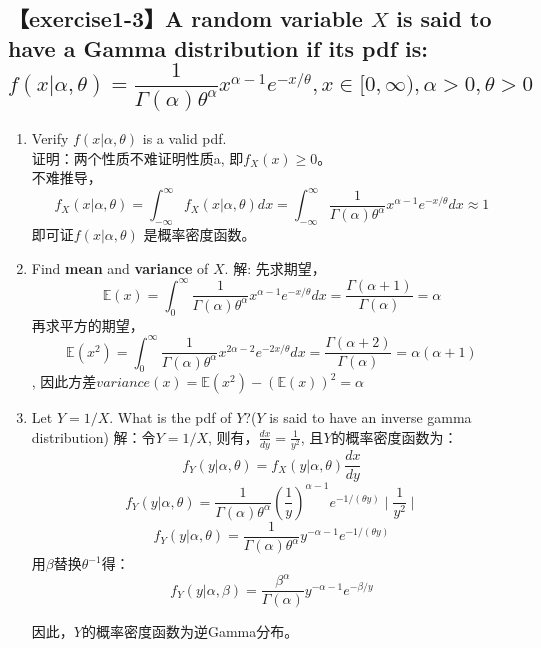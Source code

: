 \documentclass [12pt]{article}
\begin{document}
\begin{CJK*}{GBK}{kai}
\section{【exercise1-3】A random variable $X$ is said to have a Gamma distribution if its pdf is: \\
     $$f(x|\alpha,\theta)=\frac{1}{\Gamma(\alpha)\theta^\alpha}x^{\alpha-1}e^{-x/\theta},x \in [0,\infty), \alpha >0,\theta>0$$}
      \begin{enumerate}
      \item[(a)] Verify $f(x|\alpha,\theta)$ is a valid pdf.\\
      证明：两个性质不难证明性质a, 即$f_{X}(x) \ge 0$。\\
      不难推导，$$f_{X}(x|\alpha,\theta)=\int_{-\infty}^{\infty}f_{X}(x|\alpha,\theta) dx = \int_{-\infty}^{\infty}\frac{1}{\Gamma(\alpha)\theta^\alpha}x^{\alpha-1}e^{-x/\theta} dx \approx 1$$ 即可证$f(x|\alpha,\theta)$ 是概率密度函数。
      \item[(b)] Find \textbf{mean} and \textbf{variance} of $X$.
      解: 先求期望，$$\mathbb{E}(x)=\int_{0}^{\infty}{\frac{1}{\Gamma(\alpha)\theta^\alpha}x^{\alpha-1}e^{-x/\theta}}dx = \frac{\Gamma(\alpha+1)}{\Gamma(\alpha)} = \alpha$$
      	再求平方的期望，$$\mathbb{E}(x^2)=\int_{0}^{\infty}{\frac{1}{\Gamma(\alpha)\theta^\alpha}x^{2\alpha-2}e^{-2x/\theta}}dx = \frac{\Gamma(\alpha+2)}{\Gamma(\alpha)} = \alpha(\alpha+1)$$,
	因此方差$variance(x)=\mathbb{E}(x^2)-(\mathbb{E}(x))^2 =\alpha$
      \item[(c)] Let $Y=1/X$. What is the pdf of $Y$?($Y$ is said to have an inverse gamma distribution)
      解：令$Y=1/X$, 则有，$\frac{dx}{dy}=\frac{1}{y^2}$, 且$Y$的概率密度函数为：\\
      $$f_{Y}(y|\alpha,\theta)=f_{X}(y|\alpha,\theta) \frac{dx}{dy}$$
      $$f_{Y}(y|\alpha,\theta)=\frac{1}{\Gamma(\alpha)\theta^\alpha}(\frac{1}{y})^{\alpha-1}e^{-1/(\theta y)} \mid  \frac{1}{y^2}\mid$$
      $$f_{Y}(y|\alpha,\theta)=\frac{1}{\Gamma(\alpha)\theta^\alpha}y^{-\alpha-1}e^{-1/(\theta y)} $$
      用$\beta$替换$\theta^{-1}$得：
       $$f_{Y}(y|\alpha,\beta)=\frac{\beta^{\alpha}}{\Gamma(\alpha)}y^{-\alpha-1}e^{-\beta/y} $$

      因此，$Y$的概率密度函数为逆Gamma分布。
      \end{enumerate}



  \end{CJK*}
\end{document}
